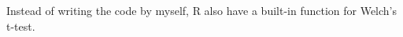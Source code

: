 \documentclass[12pt]{article}
\begin{document}
\begin{figure}[H]
\end{figure}



Instead of writing the code by myself, R also have a built-in function
for Welch's t-test.
\end{document}
